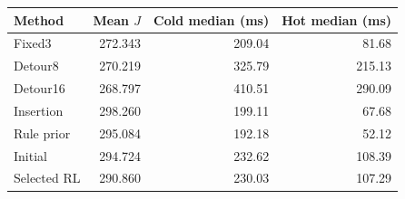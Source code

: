 \begin{tabular}{lrrr}
\hline
Method & Mean $J$ & Cold median (ms) & Hot median (ms) \\
\hline
Fixed3 & 272.343 & 209.04 & 81.68 \\
Detour8 & 270.219 & 325.79 & 215.13 \\
Detour16 & 268.797 & 410.51 & 290.09 \\
Insertion & 298.260 & 199.11 & 67.68 \\
Rule prior & 295.084 & 192.18 & 52.12 \\
Initial & 294.724 & 232.62 & 108.39 \\
Selected RL & 290.860 & 230.03 & 107.29 \\
\hline
\end{tabular}
